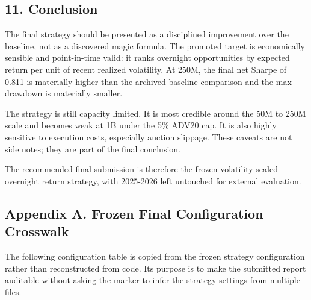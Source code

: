 \documentclass[
]{article}
\begin{document}
\hypertarget{11-conclusion}{%
\subsection{11. Conclusion}\label{11-conclusion}}

The final strategy should be presented as a disciplined improvement over
the baseline, not as a discovered magic formula. The promoted target is
economically sensible and point-in-time valid: it ranks overnight
opportunities by expected return per unit of recent realized volatility.
At 250M, the final net Sharpe of 0.811 is materially higher than the
archived baseline comparison and the max drawdown is materially smaller.

The strategy is still capacity limited. It is most credible around the
50M to 250M scale and becomes weak at 1B under the 5\% ADV20 cap. It is
also highly sensitive to execution costs, especially auction slippage.
These caveats are not side notes; they are part of the final conclusion.

The recommended final submission is therefore the frozen
volatility-scaled overnight return strategy, with 2025-2026 left
untouched for external evaluation.

\hypertarget{appendix-a-frozen-final-configuration-crosswalk}{%
\subsection{Appendix A. Frozen Final Configuration
Crosswalk}\label{appendix-a-frozen-final-configuration-crosswalk}}

The following configuration table is copied from the frozen strategy
configuration rather than reconstructed from code. Its purpose is to
make the submitted report auditable without asking the marker to infer
the strategy settings from multiple files.
\end{document}
